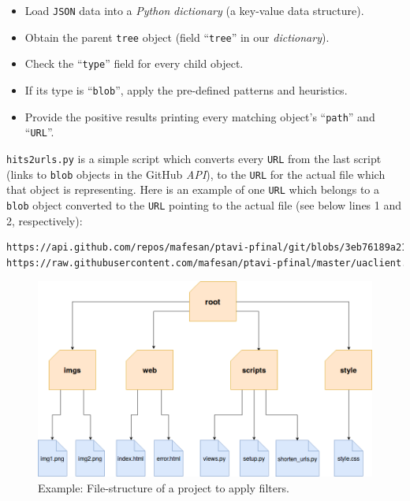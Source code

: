 \documentclass[a4paper, 12pt]{book}
\begin{document}
\begin{itemize}
  \item Load \texttt{JSON} data into a \emph{Python} \textit{dictionary} (a key-value data structure).
  \item Obtain the parent \texttt{tree} object (field ``\texttt{tree}'' in our \textit{dictionary}).
  \item Check the ``\texttt{type}'' field for every child object.
  \item If its type is ``\texttt{blob}'', apply the pre-defined patterns and heuristics.
  \item Provide the positive results printing every matching object's ``\texttt{path}'' and ``\texttt{URL}''.
\end{itemize}
\texttt{hits2urls.py} is a simple script which converts every \texttt{URL} from the last script (links to \texttt{blob} objects
in the GitHub \textit{API}), to the \texttt{URL} for the actual file which that object is representing.
Here is an example of one \texttt{URL} which belongs to a \texttt{blob} object converted to the \texttt{URL}
pointing to the actual file (see below lines 1 and 2, respectively):
\begin{lstlisting}[language=bash]
https://api.github.com/repos/mafesan/ptavi-pfinal/git/blobs/3eb76189a21a...
https://raw.githubusercontent.com/mafesan/ptavi-pfinal/master/uaclient.py \end{lstlisting}
\begin{figure}
  \centering
  \includegraphics[width=13cm, keepaspectratio]{img/file-structure-example}
  \caption{Example: File-structure of a project to apply filters.}
  \label{fig:file-structure-example}
\end{figure}
\end{document}
